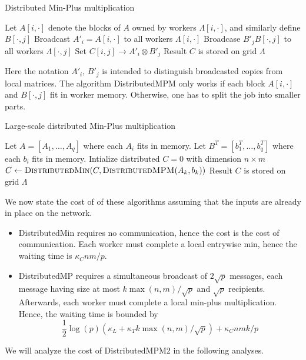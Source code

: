\documentclass{article} %
\begin{document}
\begin{algorithm}[H]
\caption{Distributed Min-Plus multiplication}
\begin{algorithmic}
  \State Let $A[i, \cdot]$ denote the blocks of $A$ owned by workers $\Lambda[i, \cdot]$, and similarly define $B[\cdot, j]$
    \State Broadcast $A'_i = A[i, \cdot]$ to all workers $\Lambda[i, \cdot]$
    \State Broadcase $B'_j B[\cdot, j]$ to all workers $\Lambda[\cdot, j]$
  \EndFor
    \State Set $C[i, j] \to A'_i \otimes B'_j$
  \EndFor
  \State Result $C$ is stored on grid $\Lambda$
\EndFunction
\end{algorithmic}
\end{algorithm}

Here the notation $A'_i$, $B'_j$ is intended to distinguish broadcasted copies from local matrices.
The algorithm {\sc DistributedMPM} only works if each block $A[i, \cdot]$ and $B[\cdot, j]$ fit in worker memory.
Otherwise, one has to split the job into smaller parts.

\begin{algorithm}[H]
\caption{Large-scale distributed Min-Plus multiplication}
\begin{algorithmic}
  \State Let $A = [A_1,\hdots, A_q]$ where each $A_i$ fits in memory.
  \State Let $B^T = [b_1^T, \hdots, b_q^T]$ where each $b_i$ fits in memory.
  \State Intialize distributed $C = 0$ with dimension $n \times m$
    \State $C \leftarrow \text{\sc DistributedMin}(C, \text{\sc DistributedMPM}(A_k, b_k))$
  \EndFor
  \State Result $C$ is stored on grid $\Lambda$
\EndFunction
\end{algorithmic}
\end{algorithm}

We now state the cost of of these algorithms assuming that the inputs
are already in place on the network.
\begin{itemize}
\item {\sc DistributedMin} requires no communication, hence the cost
  is the cost of communication.  Each worker must complete a local
  entrywise min, hence the waiting time is $\kappa_C nm/p$.
\item {\sc DistributedMP} requires a simultaneous broadcast of
  $2\sqrt{p}$ messages, each message having size at most $k\max(n,m)/\sqrt{p}$ and $\sqrt{p}$ recipients.
  Afterwards, each worker must complete a local min-plus multiplication.
  Hence, the waiting time is bounded by
\[
\frac{1}{2}\log(p) (\kappa_L + \kappa_T k \max(n, m)/\sqrt{p}) + \kappa_C nmk/p
\] 
\end{itemize}
We will analyze the cost of {\sc DistributedMPM2} in the following analyses.
\end{document}
